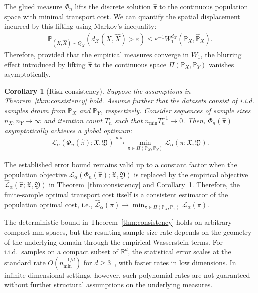 \documentclass{article}
\theoremstyle{plain}
\newtheorem{corollary}[theorem]{Corollary}
\theoremstyle{definition}
\theoremstyle{remark}
\begin{document}
The glued measure $\Phi_n$ lifts the discrete solution $\hat{\pi}$ to the continuous population space with minimal transport cost. We can quantify the spatial displacement incurred by this lifting using Markov's inequality:
\begin{align*}
	\mathbb{P}_{(X,\hat X)\sim Q_X}\!(d_{\mathcal{X}}(X,\hat{X}) > \varepsilon) \leq \varepsilon^{-1}W_1^{d_{\mathcal{X}}}(\mathbb{P}_X,\hat{\mathbb{P}}_X) .
\end{align*}
Therefore, provided that the empirical measures converge in $W_1$, the blurring effect introduced by lifting $\hat{\pi}$ to the continuous space $\Pi(\mathbb{P}_X,\mathbb{P}_Y)$ vanishes asymptotically.

\begin{corollary}[Risk consistency]
	\label{cor:convergence}
	Suppose the assumptions in Theorem~\ref{thm:consistency} hold. Assume further that the datasets consist of i.i.d. samples drawn from $\mathbb{P}_X$ and $\mathbb{P}_Y$, respectively. Consider sequences of sample sizes $n_X, n_Y \to \infty$ and iteration count $T_n$ such that $n_{\min}T_n^{-1} \to 0$.
	Then, $\Phi_n(\hat{\pi})$ asymptotically achieves a global optimum:
	\begin{align*}
		\mathcal{L}_{\alpha}(\Phi_n(\hat{\pi});\mathfrak{X},\mathfrak{Y}) \xrightarrow{a.s.} \min_{\pi \in \Pi(\mathbb{P}_X,\mathbb{P}_Y)} \mathcal{L}_{\alpha}(\pi;\mathfrak{X},\mathfrak{Y}) .
	\end{align*}
\end{corollary}

The established error bound remains valid up to a constant factor when the population objective $\mathcal{L}_{\alpha}(\Phi_n(\hat{\pi});\mathfrak{X},\mathfrak{Y})$ is replaced by the empirical objective $\hat{\mathcal{L}}_{\alpha}(\hat{\pi};\mathfrak{X},\mathfrak{Y})$ in Theorem~\ref{thm:consistency} and
Corollary~\ref{cor:convergence}. Therefore, the finite-sample optimal transport cost itself is a consistent estimator of the population optimal cost, i.e., $\hat{\mathcal{L}}_{\alpha}(\hat{\pi}) \to \min_{\pi \in \Pi(\mathbb{P}_X,\mathbb{P}_Y)} \mathcal{L}_{\alpha}(\pi)$.

The deterministic bound in Theorem~\ref{thm:consistency} holds on arbitrary compact mm spaces, but the resulting sample-size rate depends on the geometry of the underlying domain through the empirical Wasserstein terms. For i.i.d.\ samples on a compact subset of $\mathbb{R}^d$, the statistical error scales at the standard rate $O(n_{\min}^{-1/d})$ for $d \geq 3$~\citep{fournier2015rate,weed2019sharp}, with faster rates in low dimensions. In infinite-dimensional settings, however, such polynomial rates are not guaranteed without further structural assumptions on the underlying measures.
\end{document}
